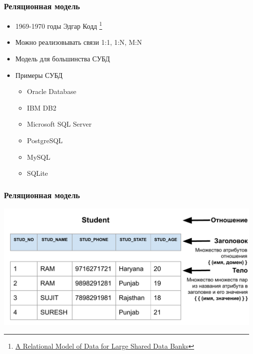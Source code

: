 \documentclass[aspectratio=169]{beamer}
\begin{document}
\begin{frame}[fragile]
  \transwipe[direction=90]
  \frametitle{Реляционная модель}

  \begin{itemize}
    \item 1969-1970 годы Эдгар Кодд \footnote{\href{ https://www.seas.upenn.edu/~zives/03f/cis550/codd.pdf}{A Relational Model of Data for Large Shared Data Banks}}
    \item Можно реализовывать связи 1:1, 1:N, M:N
    \item Модель для большинства СУБД
    \item Примеры СУБД
      \begin{itemize}
        \item Oracle Database
        \item IBM DB2
        \item Microsoft SQL Server
        \item PostgreSQL
        \item MySQL
        \item SQLite
      \end{itemize}
  \end{itemize}
\end{frame}

\begin{frame}[fragile]
  \transwipe[direction=90]
  \frametitle{Реляционная модель}

  \includegraphics[width=\linewidth]{pictures/Relational_model.pdf}
\end{frame}
\end{document}
